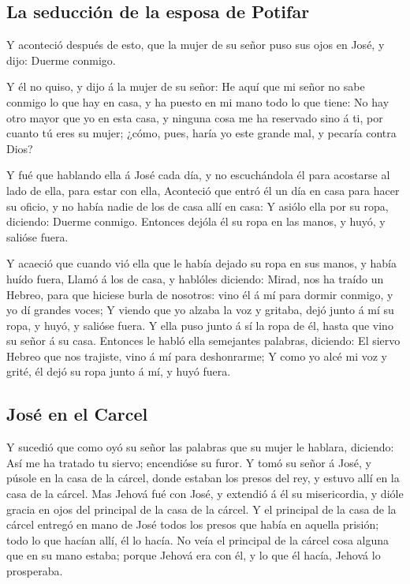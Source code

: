 \hypertarget{la-seducciuxf3n-de-la-esposa-de-potifar}{%
\subsection{La seducción de la esposa de
Potifar}\label{la-seducciuxf3n-de-la-esposa-de-potifar}}

 Y aconteció después de esto, que la mujer de su señor puso
sus ojos en José, y dijo: Duerme conmigo.

 Y él no quiso, y dijo á la mujer de su señor: He aquí que
mi señor no sabe conmigo lo que hay en casa, y ha puesto en mi mano todo
lo que tiene:  No hay otro mayor que yo en esta casa, y
ninguna cosa me ha reservado sino á ti, por cuanto tú eres su mujer;
¿cómo, pues, haría yo este grande mal, y pecaría contra Dios?

 Y fué que hablando ella á José cada día, y no escuchándola
él para acostarse al lado de ella, para estar con ella, 
Aconteció que entró él un día en casa para hacer su oficio, y no había
nadie de los de casa allí en casa:  Y asiólo ella por su
ropa, diciendo: Duerme conmigo. Entonces dejóla él su ropa en las manos,
y huyó, y salióse fuera.

 Y acaeció que cuando vió ella que le había dejado su ropa
en sus manos, y había huído fuera,  Llamó á los de casa, y
hablóles diciendo: Mirad, nos ha traído un Hebreo, para que hiciese
burla de nosotros: vino él á mí para dormir conmigo, y yo dí grandes
voces;  Y viendo que yo alzaba la voz y gritaba, dejó junto
á mí su ropa, y huyó, y salióse fuera.  Y ella puso junto á
sí la ropa de él, hasta que vino su señor á su casa. 
Entonces le habló ella semejantes palabras, diciendo: El siervo Hebreo
que nos trajiste, vino á mí para deshonrarme;  Y como yo
alcé mi voz y grité, él dejó su ropa junto á mí, y huyó fuera.

\hypertarget{josuxe9-en-el-carcel}{%
\subsection{José en el Carcel}\label{josuxe9-en-el-carcel}}

 Y sucedió que como oyó su señor las palabras que su mujer
le hablara, diciendo: Así me ha tratado tu siervo; encendióse su furor.
 Y tomó su señor á José, y púsole en la casa de la cárcel,
donde estaban los presos del rey, y estuvo allí en la casa de la cárcel.
 Mas Jehová fué con José, y extendió á él su misericordia,
y dióle gracia en ojos del principal de la casa de la cárcel.
 Y el principal de la casa de la cárcel entregó en mano de
José todos los presos que había en aquella prisión; todo lo que hacían
allí, él lo hacía.  No veía el principal de la cárcel cosa
alguna que en su mano estaba; porque Jehová era con él, y lo que él
hacía, Jehová lo prosperaba.

